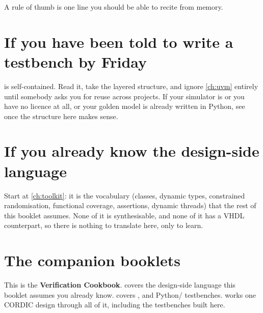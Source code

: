 \begin{ruleofthumb}
A rule of thumb is one line you should be able to recite from memory.
\end{ruleofthumb}

\section*{If you have been told to write a testbench by Friday}

 is self-contained. Read it, take the layered structure, and
ignore \cref{ch:uvm} entirely until somebody asks you for reuse across
projects. If your simulator is  or you have no licence at
all, or your golden model is already written in Python, see
 once the structure here makes sense.

\section*{If you already know the design-side language}

Start at \cref{ch:toolkit}: it is the vocabulary (classes, dynamic types,
constrained randomisation, functional coverage, assertions, dynamic
threads) that the rest of this booklet assumes. None of it is
synthesisable, and none of it has a VHDL counterpart, so there is nothing to
translate here, only to learn.

\section*{The companion booklets}

This is the \textbf{Verification Cookbook}.  covers the
design-side language this booklet assumes you already know.
 covers ,  and
Python/ testbenches.  works one CORDIC design
through all of it, including the testbenches built here.
